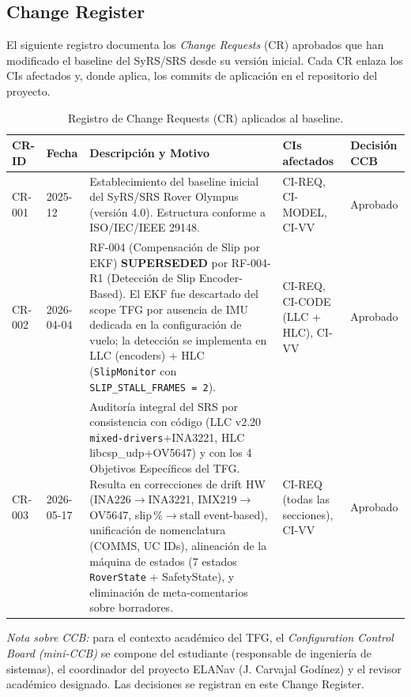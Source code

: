\subsection{Change Register}\label{subsec:change-register}

El siguiente registro documenta los \emph{Change Requests} (CR) aprobados que han modificado el baseline del SyRS/SRS desde su versión inicial. Cada CR enlaza los CIs afectados y, donde aplica, los commits de aplicación en el repositorio del proyecto.

\begin{table}[H]
\centering
\small
\begin{tabularx}{\textwidth}{| l | l | X | l | l |}
\hline
\textbf{CR-ID} & \textbf{Fecha} & \textbf{Descripción y Motivo} & \textbf{CIs afectados} & \textbf{Decisión CCB} \\ \hline

CR-001 & 2025-12 &
Establecimiento del baseline inicial del SyRS/SRS Rover Olympus (versión 4.0). Estructura conforme a ISO/IEC/IEEE 29148. &
CI-REQ, CI-MODEL, CI-VV &
Aprobado \\ \hline

CR-002 & 2026-04-04 &
RF-004 (Compensación de Slip por EKF) \textbf{SUPERSEDED} por RF-004-R1 (Detección de Slip Encoder-Based). El EKF fue descartado del scope TFG por ausencia de IMU dedicada en la configuración de vuelo; la detección se implementa en LLC (encoders) + HLC (\texttt{SlipMonitor} con \texttt{SLIP\_STALL\_FRAMES = 2}). &
CI-REQ, CI-CODE (LLC + HLC), CI-VV &
Aprobado \\ \hline

CR-003 & 2026-05-17 &
Auditoría integral del SRS por consistencia con código (LLC v2.20 \texttt{mixed-drivers}+INA3221, HLC libcsp\_udp+OV5647) y con los 4 Objetivos Específicos del TFG. Resulta en correcciones de drift HW (INA226$\rightarrow$INA3221, IMX219$\rightarrow$OV5647, slip\,\%$\rightarrow$stall event-based), unificación de nomenclatura (COMMS, UC IDs), alineación de la máquina de estados (7 estados \texttt{RoverState} + SafetyState), y eliminación de meta-comentarios sobre borradores. &
CI-REQ (todas las secciones), CI-VV &
Aprobado \\ \hline

\end{tabularx}
\caption{Registro de Change Requests (CR) aplicados al baseline.}
\label{tab:change-register}
\end{table}

\emph{Nota sobre CCB:} para el contexto académico del TFG, el \emph{Configuration Control Board (mini-CCB)} se compone del estudiante (responsable de ingeniería de sistemas), el coordinador del proyecto ELANav (J. Carvajal Godínez) y el revisor académico designado. Las decisiones se registran en este Change Register.
